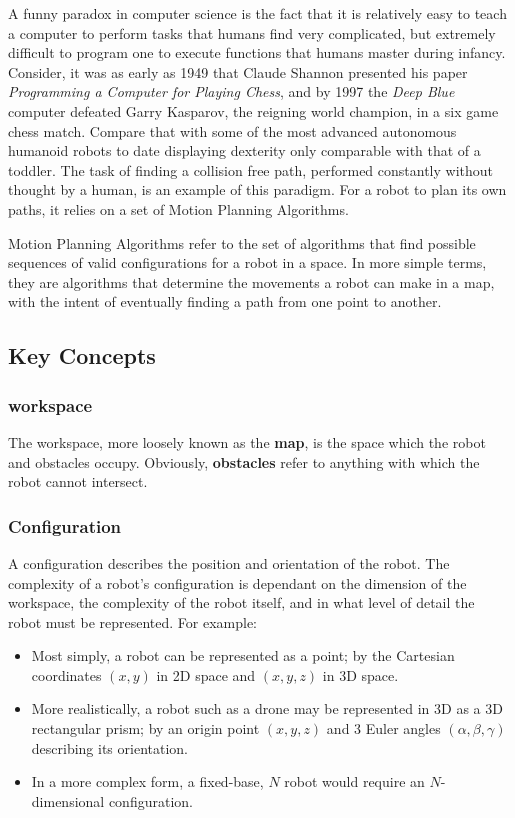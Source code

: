 
A funny paradox in computer science is the fact that it is relatively easy to teach a computer to perform tasks that humans find very complicated, but extremely difficult to program one to execute functions that humans master during infancy. Consider, it was as early as 1949 that Claude Shannon presented his paper \textit{Programming a Computer for Playing Chess}\cite{Shannon1950}, and by 1997 the \textit{Deep Blue} computer defeated Garry Kasparov, the reigning world champion, in a six game chess match.\cite{Campbell2002} Compare that with some of the most advanced autonomous humanoid robots to date displaying dexterity only comparable with that of a toddler. The task of finding a collision free path, performed constantly without thought by a human, is an example of this paradigm. For a robot to plan its own paths, it relies on a set of Motion Planning Algorithms.

Motion Planning Algorithms refer to the set of algorithms that find possible sequences of valid \gls{configuration}s for a robot in a space. In more simple terms, they are algorithms that determine the movements a robot can make in a map, with the intent of eventually finding a path from one point to another.

\subsection{Key Concepts}
    \subsubsection{\Gls{workspace}}
    The \gls{workspace}, more loosely known as the \textbf{map}, is the space which the robot and obstacles occupy. Obviously, \textbf{obstacles} refer to anything with which the robot cannot intersect.
    
    \subsubsection{Configuration}
    A configuration describes the position and orientation of the robot. The complexity of a robot's configuration is dependant on the dimension of the \gls{workspace}, the complexity of the robot itself, and in what level of detail the robot must be represented. For example:
    \begin{itemize}
        \item Most simply, a robot can be represented as a point; by the Cartesian coordinates $(x,y)$ in \gls{2D} space and $(x,y,z)$ in \gls{3D} space.
        \item More realistically, a robot such as a drone may be represented in \gls{3D} as a 3D rectangular prism; by an origin point $(x,y,z)$ and 3 Euler angles $(\alpha,\beta,\gamma)$ describing its orientation.
        \item In a more complex form, a fixed-base, $N$  robot would require an $N$-dimensional configuration.
    \end{itemize}

